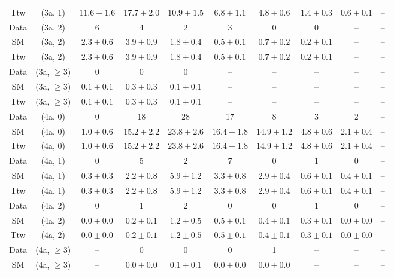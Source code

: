 \begin{table}[h!]
{\begin{tabular}{cccccccccc}
	Ttw & (3a, 1) & $11.6\pm 1.6$ & $17.7\pm 2.0$ & $10.9\pm 1.5$ & $6.8\pm 1.1$ & $4.8\pm 0.6$ & $1.4\pm 0.3$ & $0.6\pm 0.1$ & -- \\[0.5ex] 
	Data & (3a, 2) & 6 & 4 & 2 & 3 & 0 & 0 & -- & -- \\[0.5ex] 
	SM & (3a, 2) & $2.3\pm 0.6$ & $3.9\pm 0.9$ & $1.8\pm 0.4$ & $0.5\pm 0.1$ & $0.7\pm 0.2$ & $0.2\pm 0.1$ & -- & -- \\[0.5ex] 
	Ttw & (3a, 2) & $2.3\pm 0.6$ & $3.9\pm 0.9$ & $1.8\pm 0.4$ & $0.5\pm 0.1$ & $0.7\pm 0.2$ & $0.2\pm 0.1$ & -- & -- \\[0.5ex] 
	Data & (3a, $\ge3$) & 0 & 0 & 0 & -- & -- & -- & -- & -- \\[0.5ex] 
	SM & (3a, $\ge3$) & $0.1\pm 0.1$ & $0.3\pm 0.3$ & $0.1\pm 0.1$ & -- & -- & -- & -- & -- \\[0.5ex] 
	Ttw & (3a, $\ge3$) & $0.1\pm 0.1$ & $0.3\pm 0.3$ & $0.1\pm 0.1$ & -- & -- & -- & -- & -- \\[0.5ex] 
	Data & (4a, 0) & 0 & 18 & 28 & 17 & 8 & 3 & 2 & -- \\[0.5ex] 
	SM & (4a, 0) & $1.0\pm 0.6$ & $15.2\pm 2.2$ & $23.8\pm 2.6$ & $16.4\pm 1.8$ & $14.9\pm 1.2$ & $4.8\pm 0.6$ & $2.1\pm 0.4$ & -- \\[0.5ex] 
	Ttw & (4a, 0) & $1.0\pm 0.6$ & $15.2\pm 2.2$ & $23.8\pm 2.6$ & $16.4\pm 1.8$ & $14.9\pm 1.2$ & $4.8\pm 0.6$ & $2.1\pm 0.4$ & -- \\[0.5ex] 
	Data & (4a, 1) & 0 & 5 & 2 & 7 & 0 & 1 & 0 & -- \\[0.5ex] 
	SM & (4a, 1) & $0.3\pm 0.3$ & $2.2\pm 0.8$ & $5.9\pm 1.2$ & $3.3\pm 0.8$ & $2.9\pm 0.4$ & $0.6\pm 0.1$ & $0.4\pm 0.1$ & -- \\[0.5ex] 
	Ttw & (4a, 1) & $0.3\pm 0.3$ & $2.2\pm 0.8$ & $5.9\pm 1.2$ & $3.3\pm 0.8$ & $2.9\pm 0.4$ & $0.6\pm 0.1$ & $0.4\pm 0.1$ & -- \\[0.5ex] 
	Data & (4a, 2) & 0 & 1 & 2 & 0 & 0 & 1 & 0 & -- \\[0.5ex] 
	SM & (4a, 2) & $0.0\pm 0.0$ & $0.2\pm 0.1$ & $1.2\pm 0.5$ & $0.5\pm 0.1$ & $0.4\pm 0.1$ & $0.3\pm 0.1$ & $0.0\pm 0.0$ & -- \\[0.5ex] 
	Ttw & (4a, 2) & $0.0\pm 0.0$ & $0.2\pm 0.1$ & $1.2\pm 0.5$ & $0.5\pm 0.1$ & $0.4\pm 0.1$ & $0.3\pm 0.1$ & $0.0\pm 0.0$ & -- \\[0.5ex] 
	Data & (4a, $\ge3$) & -- & 0 & 0 & 0 & 1 & -- & -- & -- \\[0.5ex] 
	SM & (4a, $\ge3$) & -- & $0.0\pm 0.0$ & $0.1\pm 0.1$ & $0.0\pm 0.0$ & $0.0\pm 0.0$ & -- & -- & -- \\[0.5ex] 

\end{tabular}}
\end{table}
